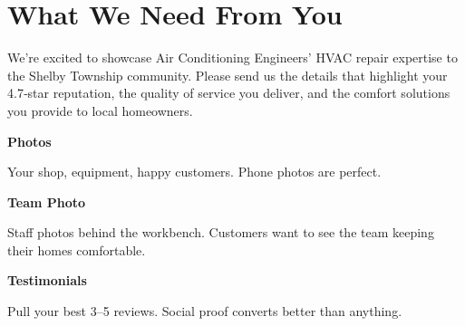 \documentclass[11pt,letterpaper]{article}
\begin{document}
\vspace{0.2em}

\section*{What We Need From You}

We’re excited to showcase Air Conditioning Engineers’ HVAC repair expertise to the Shelby Township community. Please send us the details that highlight your 4.7‑star reputation, the quality of service you deliver, and the comfort solutions you provide to local homeowners.

\vspace{0.12em}

\noindent\begin{minipage}[t]{0.48\textwidth}
\begin{tcolorbox}[colframe=accent-teal, boxrule=1pt, left=0.7em, right=0.7em, top=0.5em, bottom=0.5em, arc=4pt, boxsep=0pt]
{\bfseries\small\color{accent-teal}Photos}

\vspace{0.15em}

{\small Your shop, equipment, happy customers. Phone photos are perfect.}
\end{tcolorbox}

\vspace{0.1em}

\begin{tcolorbox}[colframe=accent-teal, boxrule=1pt, left=0.7em, right=0.7em, top=0.5em, bottom=0.5em, arc=4pt, boxsep=0pt]
{\bfseries\small\color{accent-teal}Team Photo}

\vspace{0.15em}

{\small Staff photos behind the workbench. Customers want to see the team keeping their homes comfortable.}
\end{tcolorbox}

\vspace{0.1em}

\begin{tcolorbox}[colframe=accent-teal, boxrule=1pt, left=0.7em, right=0.7em, top=0.5em, bottom=0.5em, arc=4pt, boxsep=0pt]
{\bfseries\small\color{accent-teal}Testimonials}

\vspace{0.15em}

{\small Pull your best 3–5 reviews. Social proof converts better than anything.}
\end{tcolorbox}
\end{minipage}
\end{document}
